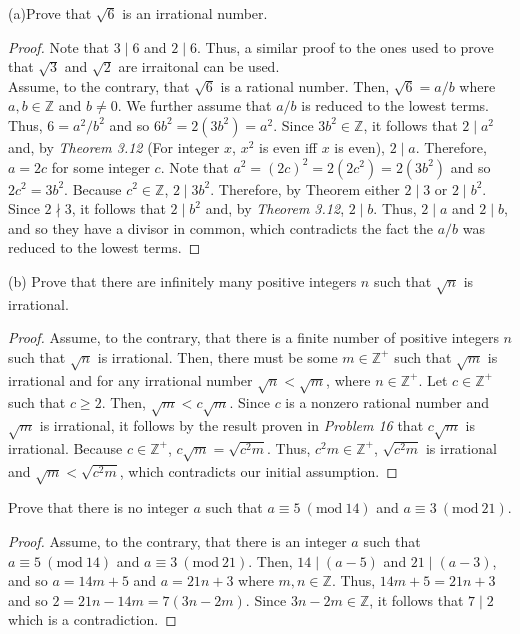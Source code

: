 \documentclass[12pt]{article}
\newcommand{\Z}{\mathbb{Z}}
\newcommand{\Mod}[1]{\ (\mathrm{mod}\ #1)}
\newenvironment{problem}[2][Problem]{\begin{trivlist}
		\item[\hskip \labelsep {\bfseries #1}\hskip \labelsep {\bfseries #2.}]}{\end{trivlist}}
\begin{document}
	\begin{problem}{21}
		(a)Prove that $\sqrt{6}$ is an irrational number.
		\begin{proof}
			Note that $3\mid 6$ and $2\mid 6$. Thus, a similar proof to the ones used to prove that $\sqrt{3}$ and $\sqrt{2}$ are irraitonal can be used.\\
			
			Assume, to the contrary, that $\sqrt{6}$ is a rational number. Then, $\sqrt{6} = a/b$ where $a,b\in \Z$ and $b\neq 0$. We further assume that $a/b$ is reduced to the lowest terms. Thus, $6 = a^{2}/b^{2}$ and so $6b^{2} = 2(3b^{2}) = a^{2}$. Since $3b^{2}\in \Z$, it follows that $2\mid a^{2}$ and, by \textit{Theorem 3.12} (For integer $x$, $x^{2}$ is even iff $x$ is even), $2\mid a$. Therefore, $a = 2c$ for some integer $c$. Note that $a^{2} = (2c)^{2} = 2(2c^{2}) = 2(3b^{2})$ and so $2c^{2} = 3b^{2}$. Because $c^{2}\in \Z$, $2\mid 3b^{2}$. Therefore, by Theorem either $2\mid 3$ or $2\mid b^{2}$. Since $2\nmid 3$, it follows that $2\mid b^{2}$ and, by \textit{Theorem 3.12}, $2\mid b$. Thus, $2\mid a$ and $2\mid b$, and so they have a divisor in common, which contradicts the fact the $a/b$ was reduced to the lowest terms.
		\end{proof}
	
		(b) Prove that there are infinitely many positive integers $n$ such that $\sqrt{n}$ is irrational.
		\begin{proof}
			Assume, to the contrary, that there is a finite number of positive integers $n$ such that $\sqrt{n}$ is irrational. Then, there must be some $m\in \Z^{+}$ such that $\sqrt{m}$ is irrational and for any irrational number $\sqrt{n} < \sqrt{m}$, where $n\in \Z^{+}$. Let $c\in \Z^{+}$ such that $c\geq 2$. Then, $\sqrt{m} < c\sqrt{m}$. Since $c$ is a nonzero rational number and $\sqrt{m}$ is irrational, it follows by the result proven in \textit{Problem 16} that $c\sqrt{m}$ is irrational. Because $c\in \Z^{+}$, $c\sqrt{m} = \sqrt{c^{2}m}$. Thus, $c^{2}m\in \Z^{+}$, $\sqrt{c^{2}m}$ is irrational and $\sqrt{m} < \sqrt{c^{2}m}$, which contradicts our initial assumption. 
		\end{proof}
	\end{problem} 

	\begin{problem}{23}
		Prove that there is no integer $a$ such that $a\equiv 5 \Mod{14}$ and $a\equiv 3 \Mod{21}$.
		\begin{proof}
			Assume, to the contrary, that there is an integer $a$ such that $a\equiv 5 \Mod{14}$ and $a\equiv 3 \Mod{21}$. Then, $14\mid (a-5)$ and $21\mid (a-3)$, and so $a = 14m +5$ and $a= 21n +3$ where $m,n\in \Z$. Thus, $14m+5 = 21n+3$ and so $2 = 21n-14m = 7(3n-2m)$. Since $3n-2m\in \Z$, it follows that $7\mid 2$ which is a contradiction. 
		\end{proof}
	\end{problem}
\end{document}
